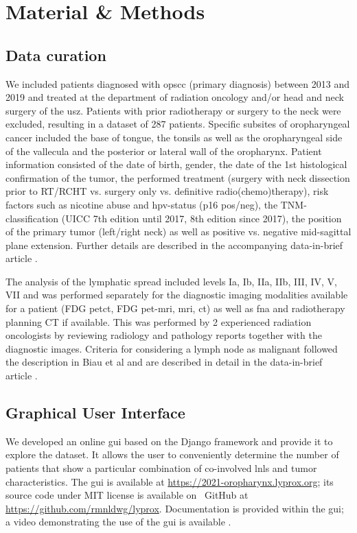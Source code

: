 \documentclass[\relativeRoot/main.tex]{subfiles}
\begin{document}
\section{Material \& Methods}
\label{sec:dataset_usz:material}

\subsection*{Data curation}

We included patients diagnosed with \gls{opscc} (primary diagnosis) between 2013 and 2019 and treated at the department of radiation oncology and/or head and neck surgery of the \gls{usz}. Patients with prior radiotherapy or surgery to the neck were excluded, resulting in a dataset of 287 patients. Specific subsites of oropharyngeal cancer included the base of tongue, the tonsils as well as the oropharyngeal side of the vallecula and the posterior or lateral wall of the oropharynx. Patient information consisted of the date of birth, gender, the date of the 1st histological confirmation of the tumor, the performed treatment (surgery with neck dissection prior to RT/RCHT vs. surgery only vs. definitive radio(chemo)therapy), risk factors such as nicotine abuse and \gls{hpv}-status (p16 pos/neg), the TNM-classification (UICC 7th edition until 2017, 8th edition since 2017), the position of the primary tumor (left/right neck) as well as positive vs. negative mid-sagittal plane extension. Further details are described in the accompanying data-in-brief article \cite{ludwig_dataset_2022}.

The analysis of the lymphatic spread included levels Ia, Ib, IIa, IIb, III, IV, V, VII and was performed separately for the diagnostic imaging modalities available for a patient (FDG \acrshort{pet}\acrshort{ct}, FDG \acrshort{pet}-\gls{mri}, \gls{mri}, \gls{ct}) as well as \gls{fna} and radiotherapy planning CT if available. This was performed by 2 experienced radiation oncologists by reviewing radiology and pathology reports together with the diagnostic images. Criteria for considering a lymph node as malignant followed the description in Biau et al \cite{biau_selection_2019} and are described in detail in the data-in-brief article \cite{ludwig_dataset_2022}.



\subsection*{Graphical User Interface}

We developed an online \gls{gui} based on the Django framework \cite{noauthor_django_2022} and provide it to explore the dataset. It allows the user to conveniently determine the number of patients that show a particular combination of co-involved \glspl{lnl} and tumor characteristics. The \gls{gui} is available at \url{https://2021-oropharynx.lyprox.org}; its source code under MIT license is available on ~GitHub at \url{https://github.com/rmnldwg/lyprox}. Documentation is provided within the \gls{gui}; a video demonstrating the use of the \gls{gui} is available .
\end{document}
